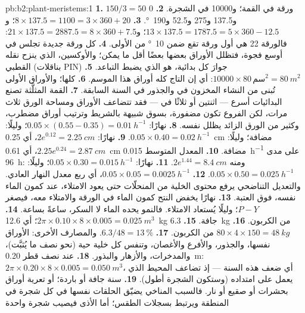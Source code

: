 \begin{solution}{pb:b2:plant-meristems:1}
\textbf{1.} $150/3 = 50$ ورقة في القمة؛ و\num{10000} في الشجرة.
\textbf{2.} 0 و137.5 و275 و52.5 و\qty{190}{\degree}.
\textbf{3.} $8\times 137.5 = 1100 = 3\times 360 + 20$؛ و$13\times 137.5
= 1787.5 = 5\times 360 - 12.5$؛ و$21\times 137.5 = 2887.5 = 8\times 360
+ 7.5$: فالورقة 22 هي أول ورقة تقع ضمن \qty{10}{\degree} من
الأولى.
\textbf{4.} كل ورقة جديدة تجلس في أوسع فجوة، فتظلل الأوراق
بعضها بعضًا أقل ما يمكن؛ والأوكسين، الذي ينزح نقله القطبي (بناقلات
PIN) جوارَ كل بدائية، هو الذي يضبط
التباعد.
\textbf{5.} $\num{10000}\times 80\,\text{سم}^{2} = \qty{80}{m^2}$: أي إن
التاج كله أوراق هذا الموسم.
\textbf{6.} كلها؛ والأوراق الأولى تُبنى من النشاء المخزون
في  والجذور في السنة السابقة.
\textbf{7.} القمة المثلَّثة تصنع البدائيات أسرع --- اثنتين أو ثلاثًا في
 --- فقد تتضاعف الأوراق ومساحة الورق ثلاث مرات، لكن الفروع
تكون مضفورة، بسوق شبيهة بالشريط وترتيب أوراق
مضطرب، وكثير من الورق الزائد يظلل نفسه.
\textbf{8.} نهارًا: $0.05\times(0.55 - 0.35) = \qty{0.01}{h^{-1}}$؛ وليلًا:
$0.05\times 0.40 = \qty{0.02}{h^{-1}}$.
\textbf{9.} نهارًا: $2e^{0.12} = \qty{2.25}{cm}$، أي \qty{0.25}{cm} مضافة؛
وليلًا: $2.25e^{0.24} = \qty{2.87}{cm}$، أي \qty{0.61}{cm} مضافة.
\textbf{10.} المعدل المتوسط \qty{0.015}{h^{-1}} على مدى \qty{96}{h}: ومنه $2e^{1.44}
= \qty{8.4}{cm}$.
\textbf{11.} نهارًا: $0.05\times 0.30 = \qty{0.015}{h^{-1}}$؛ وليلًا:
$0.05\times 0.50 = \qty{0.025}{h^{-1}}$.
\textbf{12.} $0.05\times 0.05 = \qty{0.0025}{h^{-1}}$، أي ربع معدل
النهار العادي. والتعديل التناضحي يرفع محتوى الخلية من المنحلّات
حتى يعود الامتلاء، عند كمون الماء نفسه، فوق
العتبة.
\textbf{13.} نهارًا يخفض النتح كمون الماء في
الورقة والامتلاء معه، فيصغر $P - Y$؛ وليلًا يُستعاد الامتلاء.
فالنمو يحده الماء لا السكر، ساعةً بساعة.
\textbf{14.} $2\pi\times 0.10\times 8\times 0.005 = \qty{0.025}{m^3}$؛
أي \qty{12.6}{kg} جافة.
\textbf{15.} \qty{6.3}{kg} من الكربون.
\textbf{16.} $80\times 4\times 150 = \qty{48}{kg}$ من الكربون.
\textbf{17.} $6.3/48 = \qty{13}{\%}$. والمصارف الأخرى: الأوراق
نفسها، والجذور، والأفرع والأغصان، وتنفس كل
خلية حية (نحو نصف ما يُثبَّت)، والمدخرات، والأزهار
والبذور.
\textbf{18.} عند نصف قطر \qty{0.20}{m}: $2\pi\times 0.20\times 8\times
0.005 = \qty{0.050}{m^3}$، أي ضعف هذه السنة --- إذ تضاعف المحيط
الذي يعمل  على امتداده (وستكون الشجرة أطول).
\textbf{19.} سنة جافة أو باردة؛ أو تعرية أوراق بحشرات أو صقيع
أو نار. فالسبب المناخي يضيّق الحلقات نفسها في كل شجرة في
المنطقة ويرتبط بسجلات الطقس؛ أما الأذى فيصيب شجرة واحدة

\end{solution}

